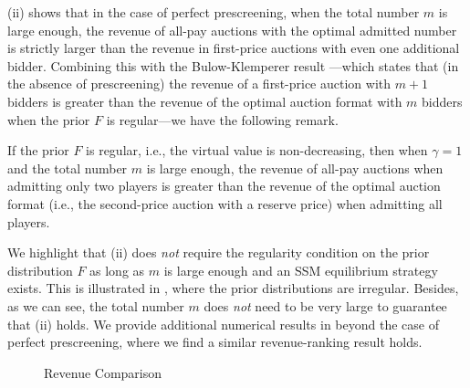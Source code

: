  (ii) shows that in the case of perfect prescreening, when the total number $m$ is large enough, the revenue of all-pay auctions with the optimal admitted number is strictly larger than the revenue in first-price auctions with even one additional bidder. Combining this with the Bulow-Klemperer result \citep{bulow_1994_auctions_negotiations}—which states that (in the absence of prescreening) the revenue of a first-price auction with $m+1$ bidders is greater than the revenue of the optimal auction format with $m$ bidders when the prior $F$ is regular—we have the following remark.
\begin{remark}
 If the prior $F$ is regular, i.e., the virtual value is non-decreasing, then when $\gamma=1$ and the total number $m$ is large enough, the revenue of all-pay auctions when admitting only two players is greater than the revenue of the optimal auction format (i.e., the second-price auction with a reserve price) when admitting all players.
\end{remark}

We highlight that  (ii) does \textit{not} require the regularity condition on the prior distribution $F$ as long as $m$ is large enough and an SSM equilibrium strategy exists. This is illustrated in , where the prior distributions are irregular. Besides, as we can see, the total number $m$ does \textit{not} need to be very large to guarantee that  (ii) holds.
We provide additional numerical results in  beyond the case of perfect prescreening, where we find a similar revenue-ranking result holds.







\begin{figure}[ht]
    \centering
    \resizebox{0.8\textwidth}{!}{%
    }
    \caption{Revenue Comparison}
    \label{fig:rev_comparison}
\end{figure}
